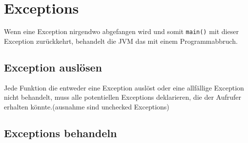 \section*{Exceptions}
	\vspace{-0.7cm}
	Wenn eine Exception nirgendwo abgefangen wird und somit \texttt{main()} mit dieser Exception zurückkehrt, behandelt die JVM das mit einem Programmabbruch.\\
	\begin{minipage}[t]{11cm}
		\subsection*{Exception auslösen}
			Jede Funktion die entweder eine Exception auslöst oder eine allfällige Exception nicht behandelt, muss alle potentiellen Exceptions deklarieren, die der Aufrufer erhalten könnte.(ausnahme sind unchecked Exceptions)
			
	\end{minipage}
	\hspace*{0.5cm}
	\begin{minipage}[t]{7.3cm}
		\subsection*{Exceptions behandeln}
			
	\end{minipage}
